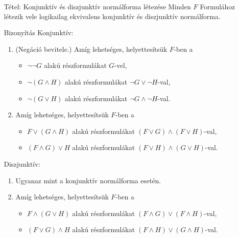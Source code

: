 \documentclass{beamer}
\begin{document}
\begin{frame}

\begin{block}{Tétel: Konjunktív és diszjunktív normálforma létezése}
Minden $F$ Formulához létezik vele logikailag ekvivalens konjunktív és diszjunktív normálforma.

\end{block}

\begin{block}{Bizonyítás}
Konjunktív:
\begin{enumerate}
	\item (Negáció bevitele.) Amíg lehetséges, helyettesítsük $F$-ben a
	\begin{itemize}
		\item $\neg \neg G$ alakú részformulákat $G$-vel,
		\item $\neg (G \land H)$ alakú részformulákat $\neg G \lor \neg H$-val,
		\item $\neg (G \lor H)$ alakú részformulákat $\neg G \land \neg H$-val.
	\end{itemize}
	\item Amíg lehetséges, helyettesítsük $F$-ben a
	\begin{itemize}
		\item $F \lor (G \land H)$ alakú részformulákat $(F \lor G) \land (F \lor H)$-val,
		\item $(F \land G) \lor H$ alakú részformulákat $(F \lor H) \land (G \lor H)$-val.
	\end{itemize}
\end{enumerate}

Diszjunktív:
\begin{enumerate}
	\item Ugyanaz mint a konjunktív normálforma esetén.
	\item Amíg lehetséges, helyettesítsük $F$-ben a
	\begin{itemize}
		\item $F \land (G \lor H)$ alakú részformulákat $(F \land G) \lor (F \land H)$-val,
		\item $(F \lor G) \land H$ alakú részformulákat $(F \land H) \lor (G \land H)$-val.
	\end{itemize}
\end{enumerate}
\end{block}

\end{frame}
\end{document}
